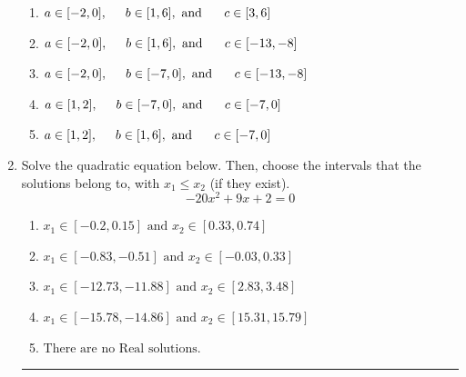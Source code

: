 \documentclass[14pt]{extbook}
\newcommand{\litem}[1]{\item#1\hspace*{-1cm}\rule{\textwidth}{0.4pt}}
\begin{document}
\begin{enumerate}
{\begin{center}
\end{center}
\begin{enumerate}[label=\Alph*.]
\item \( a \in [-2, 0], \hspace*{5mm} b \in [1, 6], \text{ and } \hspace*{5mm} c \in [3, 6] \)
\item \( a \in [-2, 0], \hspace*{5mm} b \in [1, 6], \text{ and } \hspace*{5mm} c \in [-13, -8] \)
\item \( a \in [-2, 0], \hspace*{5mm} b \in [-7, 0], \text{ and } \hspace*{5mm} c \in [-13, -8] \)
\item \( a \in [1, 2], \hspace*{5mm} b \in [-7, 0], \text{ and } \hspace*{5mm} c \in [-7, 0] \)
\item \( a \in [1, 2], \hspace*{5mm} b \in [1, 6], \text{ and } \hspace*{5mm} c \in [-7, 0] \)

\end{enumerate} }
\litem{
Solve the quadratic equation below. Then, choose the intervals that the solutions belong to, with $x_1 \leq x_2$ (if they exist).\[ -20x^{2} +9 x + 2 = 0 \]\begin{enumerate}[label=\Alph*.]
\item \( x_1 \in [-0.2, 0.15] \text{ and } x_2 \in [0.33, 0.74] \)
\item \( x_1 \in [-0.83, -0.51] \text{ and } x_2 \in [-0.03, 0.33] \)
\item \( x_1 \in [-12.73, -11.88] \text{ and } x_2 \in [2.83, 3.48] \)
\item \( x_1 \in [-15.78, -14.86] \text{ and } x_2 \in [15.31, 15.79] \)
\item \( \text{There are no Real solutions.} \)


\end{enumerate}}
\end{enumerate}
\end{document}
